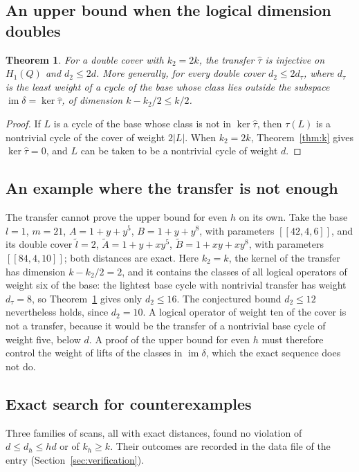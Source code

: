 \documentclass[11pt,a4paper]{article}
\newtheorem{theorem}{Theorem}
\theoremstyle{definition}
\theoremstyle{plain}
\DeclareMathOperator{\im}{im}
\newcommand{\htau}{\hat\tau}
\newcommand{\code}[1]{[\![#1]\!]}
\begin{document}
\subsection{An upper bound when the logical dimension doubles}

\begin{theorem}\label{thm:upper}
For a double cover with $k_2=2k$, the transfer $\htau$ is injective on
$H_1(Q)$ and $d_2\le2d$. More generally, for every double cover
$d_2\le2d_\tau$, where $d_\tau$ is the least weight of a cycle of the base
whose class lies outside the subspace $\im\delta=\ker\htau$, of dimension
$k-k_2/2\le k/2$.
\end{theorem}

\begin{proof}
If $L$ is a cycle of the base whose class is not in $\ker\htau$, then
$\tau(L)$ is a nontrivial cycle of the cover of weight $2|L|$. When
$k_2=2k$, Theorem~\ref{thm:k} gives $\ker\htau=0$, and $L$ can be taken to be
a nontrivial cycle of weight $d$.
\end{proof}

\subsection{An example where the transfer is not enough}\label{sec:example}
The transfer cannot prove the upper bound for even $h$ on its own. Take the
base $l=1$, $m=21$, $A=1+y+y^5$, $B=1+y+y^8$, with parameters
$\code{42,4,6}$, and its double cover $\tilde l=2$, $\tilde A=1+y+xy^5$,
$\tilde B=1+xy+xy^8$, with parameters $\code{84,4,10}$; both distances are
exact. Here $k_2=k$, the kernel of the transfer has dimension $k-k_2/2=2$, and
it contains the classes of all logical operators of weight six of the base:
the lightest base cycle with nontrivial transfer has weight $d_\tau=8$, so
Theorem~\ref{thm:upper} gives only $d_2\le16$. The conjectured bound
$d_2\le12$ nevertheless holds, since $d_2=10$. A logical operator of weight
ten of the cover is not a transfer, because it would be the transfer of a
nontrivial base cycle of weight five, below $d$. A proof of the upper bound
for even $h$ must therefore control the weight of lifts of the classes in
$\im\delta$, which the exact sequence does not do.

\subsection{Exact search for counterexamples}\label{sec:scans}
Three families of scans, all with exact distances, found no violation of
$d\le d_h\le hd$ or of $k_h\ge k$. Their outcomes are recorded in the data
file of the entry (Section~\ref{sec:verification}).
\end{document}
